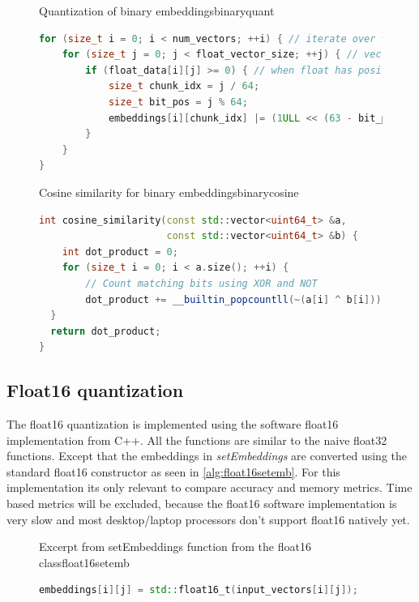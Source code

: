 \begin{figure}[h]
    \begin{algorithm}{Quantization of binary embeddings}{binaryquant}
        \begin{lstlisting}[language=C++]
for (size_t i = 0; i < num_vectors; ++i) { // iterate over vectors
    for (size_t j = 0; j < float_vector_size; ++j) { // vec elements
        if (float_data[i][j] >= 0) { // when float has positive val
            size_t chunk_idx = j / 64;
            size_t bit_pos = j % 64;
            embeddings[i][chunk_idx] |= (1ULL << (63 - bit_pos));
        }
    }
}
    \end{lstlisting}
    \end{algorithm}
\end{figure}

\begin{figure}[h]
    \begin{algorithm}{Cosine similarity for binary embeddings}{binarycosine}
        \begin{lstlisting}[language=C++]
int cosine_similarity(const std::vector<uint64_t> &a,
                      const std::vector<uint64_t> &b) {
    int dot_product = 0;
    for (size_t i = 0; i < a.size(); ++i) {
        // Count matching bits using XOR and NOT
        dot_product += __builtin_popcountll(~(a[i] ^ b[i]));
  }
  return dot_product;
}
    \end{lstlisting}
    \end{algorithm}
\end{figure}
\subsection{Float16 quantization}
\label{sec:float16}
The float16 quantization is implemented using the software float16 implementation from C++. All the functions are similar to the naive float32 functions. Except that the embeddings in \textit{setEmbeddings} are converted using the standard float16 constructor as seen in \autoref{alg:float16setemb}. For this implementation its only relevant to compare accuracy and memory metrics. Time based metrics will be excluded, because the float16 software implementation is very slow and most desktop/laptop processors don't support float16 natively yet.
\begin{figure}[h]
    \begin{algorithm}{Excerpt from setEmbeddings function from the float16 class}{float16setemb}
        \begin{lstlisting}[language=C++]
embeddings[i][j] = std::float16_t(input_vectors[i][j]);
    \end{lstlisting}
    \end{algorithm}
\end{figure}
